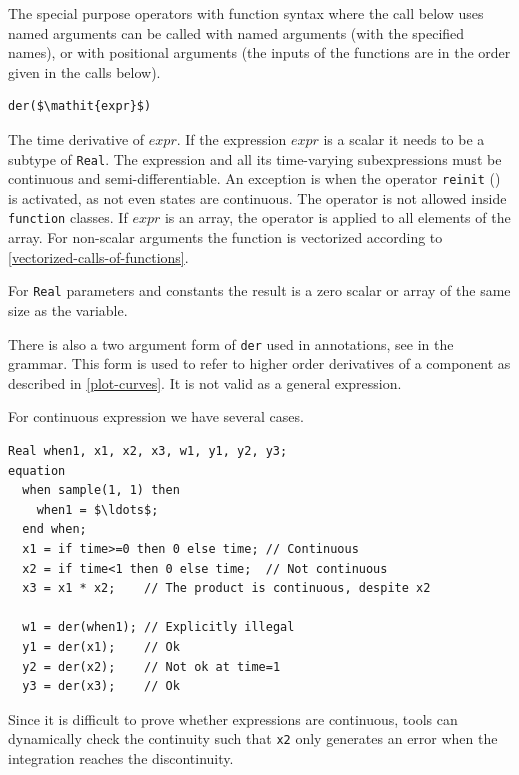 The special purpose operators with function syntax where the call below uses named arguments can be called with named arguments (with the specified names), or with positional arguments (the inputs of the functions are in the order given in the calls below).

\begin{operatordefinition}[der]
\begin{synopsis}\begin{lstlisting}
der($\mathit{expr}$)
\end{lstlisting}\end{synopsis}
\begin{semantics}
The time derivative of $\mathit{expr}$.
If the expression $\mathit{expr}$ is a scalar it needs to be a subtype of \lstinline!Real!.
The expression and all its time-varying subexpressions must be continuous and semi-differentiable.
An exception is when the operator \lstinline!reinit! () is activated, as not even states are continuous.
The operator is not allowed inside \lstinline!function! classes.
If $\mathit{expr}$ is an array, the operator is applied to all elements of the array.
For non-scalar arguments the function is vectorized according to \cref{vectorized-calls-of-functions}.

\begin{nonnormative}
For \lstinline!Real! parameters and constants the result is a zero scalar or array of the same size as the variable.
\end{nonnormative}

\begin{nonnormative}
There is also a two argument form of \lstinline!der! used in annotations, see  in the grammar.
This form is used to refer to higher order derivatives of a component as described in \cref{plot-curves}.
It is not valid as a general expression.
\end{nonnormative}

\begin{example}
For continuous expression we have several cases.
\begin{lstlisting}[language=modelica]
  Real when1, x1, x2, x3, w1, y1, y2, y3;
equation
  when sample(1, 1) then
    when1 = $\ldots$;
  end when;
  x1 = if time>=0 then 0 else time; // Continuous
  x2 = if time<1 then 0 else time;  // Not continuous
  x3 = x1 * x2;    // The product is continuous, despite x2

  w1 = der(when1); // Explicitly illegal
  y1 = der(x1);    // Ok
  y2 = der(x2);    // Not ok at time=1
  y3 = der(x3);    // Ok
\end{lstlisting}
Since it is difficult to prove whether expressions are continuous, tools can dynamically check the continuity such that \lstinline!x2! only generates an error when the integration reaches the discontinuity.
\end{example}


\end{semantics}
\end{operatordefinition}
